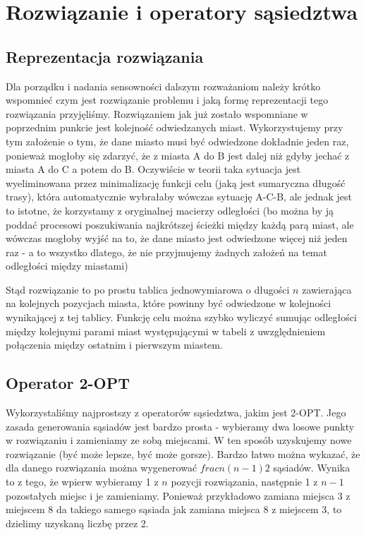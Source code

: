 \section{Rozwiązanie i operatory sąsiedztwa}
\subsection{Reprezentacja rozwiązania}
Dla porządku i nadania sensowności dalszym rozważaniom należy krótko wspomnieć czym jest rozwiązanie problemu i jaką formę reprezentacji tego rozwiązania przyjęliśmy. Rozwiązaniem jak już zostało wspomniane w poprzednim punkcie jest kolejność odwiedzanych miast. Wykorzystujemy przy tym założenie o tym, że dane miasto musi być odwiedzone dokładnie jeden raz, ponieważ mogłoby się zdarzyć, że z miasta A do B jest dalej niż gdyby jechać z miasta A do C a potem do B. Oczywiście w teorii taka sytuacja jest wyeliminowana przez minimalizację funkcji celu (jaką jest sumaryczna długość trasy), która automatycznie wybrałaby wówczas sytuację A-C-B, ale jednak jest to istotne, że korzystamy z oryginalnej macierzy odległości (bo można by ją poddać procesowi poszukiwania najkrótszej ścieżki między każdą parą miast, ale wówczas mogłoby wyjść na to, że dane miasto jest odwiedzone więcej niż jeden raz - a to wszystko dlatego, że nie przyjmujemy żadnych założeń na temat odległości między miastami)

Stąd rozwiązanie to po prostu tablica jednowymiarowa o długości $n$ zawierająca na kolejnych pozycjach miasta, które powinny być odwiedzone w kolejności wynikającej z tej tablicy. Funkcję celu można szybko wyliczyć sumując odległości między kolejnymi parami miast występującymi w tabeli z uwzględnieniem połączenia między ostatnim i pierwszym miastem.
\subsection{Operator 2-OPT}
Wykorzystaliśmy najprostszy z operatorów sąsiedztwa, jakim jest 2-OPT. Jego zasada generowania sąsiadów jest bardzo prosta - wybieramy dwa losowe punkty w rozwiązaniu i zamieniamy ze sobą miejscami. W ten sposób uzyskujemy nowe rozwiązanie (być może lepsze, być może gorsze). Bardzo łatwo można wykazać, że dla danego rozwiązania można wygenerować $frac{n(n-1)}{2}$ sąsiadów. Wynika to z tego, że wpierw wybieramy 1 z $n$ pozycji rozwiązania, następnie 1 z $n-1$ pozostałych miejsc i je zamieniamy. Ponieważ przykładowo zamiana miejsca 3 z miejscem 8 da takiego samego sąsiada jak zamiana miejsca 8 z miejscem 3, to dzielimy uzyskaną liczbę przez 2.